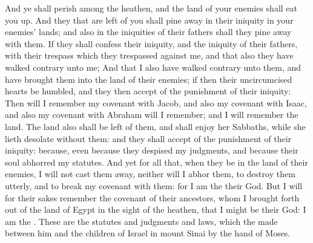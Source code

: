 \begin{biblechapter}
\verse And ye shall perish among the heathen, and the land of your enemies shall eat you up.
\verse And they that are left of you shall pine away in their iniquity in your enemies' lands; and also in the iniquities of their fathers shall they pine away with them.
\verse If they shall confess their iniquity, and the iniquity of their fathers, with their trespass which they trespassed against me, and that also they have walked contrary unto me;
\verse And that I also have walked contrary unto them, and have brought them into the land of their enemies; if then their uncircumcised hearts be humbled, and they then accept of the punishment of their iniquity:
\verse Then will I remember my covenant with Jacob, and also my covenant with Isaac, and also my covenant with Abraham will I remember; and I will remember the land.
\verse The land also shall be left of them, and shall enjoy her Sabbaths, while she lieth desolate without them: and they shall accept of the punishment of their iniquity: because, even because they despised my judgments, and because their soul abhorred my statutes.
\verse And yet for all that, when they be in the land of their enemies, I will not cast them away, neither will I abhor them, to destroy them utterly, and to break my covenant with them: for I am the \LORD their God.
\verse But I will for their sakes remember the covenant of their ancestors, whom I brought forth out of the land of Egypt in the sight of the heathen, that I might be their God: I am the \LORD.
\verse These are the statutes and judgments and laws, which the \LORD made between him and the children of Israel in mount Sinai by the hand of Moses.
\end{biblechapter}


